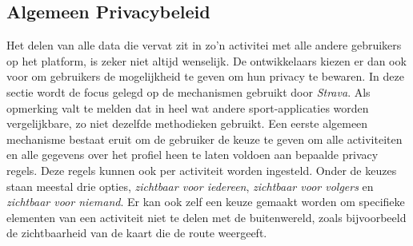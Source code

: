\subsection{Algemeen Privacybeleid}\label{Algemene Privacy}
Het delen van alle data die vervat zit in zo'n activitei met alle andere
gebruikers op het platform, is zeker niet altijd wenselijk. De ontwikkelaars
kiezen er dan ook voor om gebruikers de mogelijkheid te geven om hun privacy te
bewaren. In deze sectie wordt de focus gelegd op de mechanismen gebruikt door
\textit{Strava}. Als opmerking valt te melden dat in heel wat andere
sport-applicaties worden vergelijkbare, zo niet dezelfde methodieken gebruikt.
Een eerste algemeen mechanisme bestaat eruit om de gebruiker de keuze te geven
om alle activiteiten en alle gegevens over het profiel heen te laten voldoen
aan bepaalde privacy regels. Deze regels kunnen ook per activiteit worden
ingesteld. Onder de keuzes staan meestal drie opties, \textit{zichtbaar voor
    iedereen}, \textit{zichtbaar voor volgers} en \textit{zichtbaar voor niemand}.
Er kan ook zelf een keuze gemaakt worden om specifieke elementen van een
activiteit niet te delen met de buitenwereld, zoals bijvoorbeeld de
zichtbaarheid van de kaart die de route weergeeft.\cite{Activity24:online}

